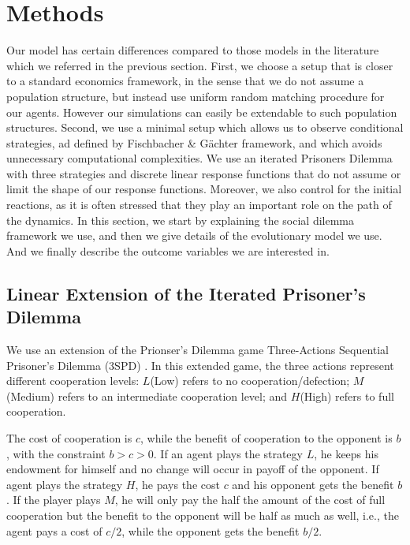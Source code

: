 \documentclass[12pt]{article}
\begin{document}
\section{Methods}

Our model has certain differences compared to those models in the literature which we referred in the previous section. First, we choose a setup that is closer to a standard economics framework, in the sense that we do not assume a population structure, but instead use uniform random matching procedure for our agents. However our simulations can easily be extendable to such population structures. Second, we use a minimal setup which allows us to observe conditional strategies, ad defined by Fischbacher \& G{\"a}chter framework, and which avoids unnecessary computational complexities. We use an iterated Prisoners Dilemma with three strategies and discrete linear response functions that do not assume or limit the shape of our response functions. Moreover, we also control for the initial reactions, as it is often stressed that they play an important role on the path of the dynamics. In this section, we start by explaining the social dilemma framework we use, and then we give details of the evolutionary model we use. And we finally describe the outcome variables we are interested in. 

\subsection{Linear Extension of the Iterated Prisoner's Dilemma} 
 We use an extension of the Prionser's Dilemma game Three-Actions Sequential Prisoner’s Dilemma (3SPD) \citep{andreozzi2020stability}. In this extended game, the three actions represent different cooperation levels: $L$(Low) refers to no cooperation/defection; $M$(Medium) refers to an intermediate cooperation level; and $H$(High) refers to full cooperation.  

The cost of cooperation is $c$, while the benefit of cooperation to the opponent is $b$, with the constraint $b>c>0$. If an agent plays the strategy $L$, he keeps his endowment for himself and no change will occur in payoff of the opponent. If agent plays the strategy $H$, he pays the cost $c$ and his opponent gets the benefit $b$. If the player plays $M$, he will only pay the half the amount of the cost of full cooperation but the benefit to the opponent will be half as much as well, i.e., the agent pays a cost of $c/2$, while the opponent gets the benefit $b/2$. 
\end{document}
